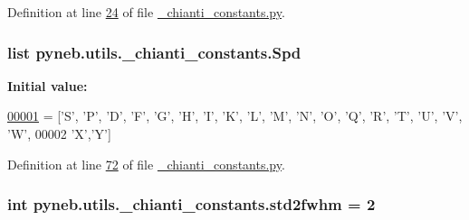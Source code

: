 Definition at line \hyperlink{__chianti__constants_8py_source_l00024}{24} of file \hyperlink{__chianti__constants_8py_source}{\+\_\+chianti\+\_\+constants.\+py}.

\hypertarget{namespacepyneb_1_1utils_1_1__chianti__constants_a747bb75e4249625a2aefd7060478096f}{}
\subsubsection[{Spd}]{\setlength{\rightskip}{0pt plus 5cm}list pyneb.\+utils.\+\_\+chianti\+\_\+constants.\+Spd}\label{namespacepyneb_1_1utils_1_1__chianti__constants_a747bb75e4249625a2aefd7060478096f}
{\bfseries Initial value\+:}
\begin{DoxyCode}
\hypertarget{namespacepyneb_1_1utils_1_1__chianti__constants_l00001}{}\hyperlink{namespacepyneb_1_1utils_1_1__chianti__constants}{00001} = [\textcolor{stringliteral}{'S'}, \textcolor{stringliteral}{'P'}, \textcolor{stringliteral}{'D'}, \textcolor{stringliteral}{'F'}, \textcolor{stringliteral}{'G'}, \textcolor{stringliteral}{'H'}, \textcolor{stringliteral}{'I'}, \textcolor{stringliteral}{'K'}, \textcolor{stringliteral}{'L'}, \textcolor{stringliteral}{'M'}, \textcolor{stringliteral}{'N'}, \textcolor{stringliteral}{'O'}, \textcolor{stringliteral}{'Q'}, \textcolor{stringliteral}{'}\textcolor{stringliteral}{R', '}T', '\textcolor{stringliteral}{U', '}V', 'W',
00002        \textcolor{stringliteral}{'X'},\textcolor{stringliteral}{'Y'}]
\end{DoxyCode}


Definition at line \hyperlink{__chianti__constants_8py_source_l00072}{72} of file \hyperlink{__chianti__constants_8py_source}{\+\_\+chianti\+\_\+constants.\+py}.

\hypertarget{namespacepyneb_1_1utils_1_1__chianti__constants_aa3ee9d102b81039a0142254fbf5eb8fe}{}
\subsubsection[{std2fwhm}]{\setlength{\rightskip}{0pt plus 5cm}int pyneb.\+utils.\+\_\+chianti\+\_\+constants.\+std2fwhm = 2}\label{namespacepyneb_1_1utils_1_1__chianti__constants_aa3ee9d102b81039a0142254fbf5eb8fe}


